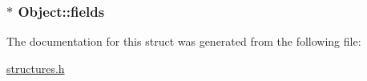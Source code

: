 \subsubsection[{\texorpdfstring{fields}{fields}}]{$\ast$ Object\+::fields}\hypertarget{structObject_a80adc59e34cc54216d8e7a6c9a4e9264}{}\label{structObject_a80adc59e34cc54216d8e7a6c9a4e9264}


The documentation for this struct was generated from the following file\+:\begin{DoxyCompactItemize}
\item 
\hyperlink{structures_8h}{structures.\+h}\end{DoxyCompactItemize}
